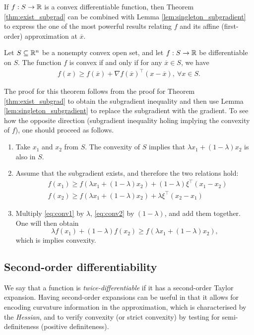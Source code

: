 If $f:S \to \mathbb{R}$ is a convex differentiable function, then Theorem \ref{thm:exist_subgrad} can be combined with Lemma \ref{lem:singleton_subgradient} to express the one of the most powerful results relating $f$ and its affine (first-order) approximation at $\overline{x}$.
%
\begin{theorem}\label{thm:convex_affine_bound}
	Let $S \subseteq \mathbb{R}^n$ be a nonempty convex open set, and let $f:S \to \mathbb{R}$ be differentiable on $S$. The function $f$ is convex if and only if for any $\overline{x} \in S$, we have
	\begin{align*}
		f(x) \geq f(\overline{x}) + \nabla f(\overline{x})^\top(x - \overline{x}), ~\forall x \in S.
	\end{align*}
\end{theorem}
%
The proof for this theorem follows from the proof for Theorem \ref{thm:exist_subgrad} to obtain the subgradient inequality and then use Lemma \ref{lem:singleton_subgradient} to replace the subgradient with the gradient. To see how the opposite direction (subgradient inequality holing implying the convexity of $f$), one should proceed as follows. 
\begin{enumerate}
	\item Take $x_1$ and $x_2$ from $S$. The convexity of $S$ implies that $\lambda x_1 + (1-\lambda)x_2$ is also in $S$.
	\item Assume that the subgradient exists, and therefore the two relations hold:
	\begin{align}
		& f(x_1) \ge f(\lambda x_1 + (1-\lambda )x_2) + (1-\lambda )\xi^\top (x_1- x_2) \label{eq:conv1} \\
		& f(x_2) \ge f(\lambda x_1 + (1-\lambda )x_2) + \lambda \xi^\top (x_2- x_1) \label{eq:conv2}
	 \end{align}
	 \item Multiply \eqref{eq:conv1} by $\lambda$, \eqref{eq:conv2} by $(1-\lambda)$, and add them together. One will then obtain
	$$\lambda f(x_1) + (1-\lambda)f(x_2) \ge f(\lambda x_1 + (1-\lambda )x_2),$$ which is implies convexity.	 
\end{enumerate}



\subsection{Second-order differentiability}

 
We say that a function is \emph{twice-differentiable} if it has a second-order Taylor expansion. Having second-order expansions can be useful in that it allows for encoding curvature information in the approximation, which is characterised by the \emph{Hessian}, and to verify convexity (or strict convexity) by testing for semi-definiteness (positive definiteness).

